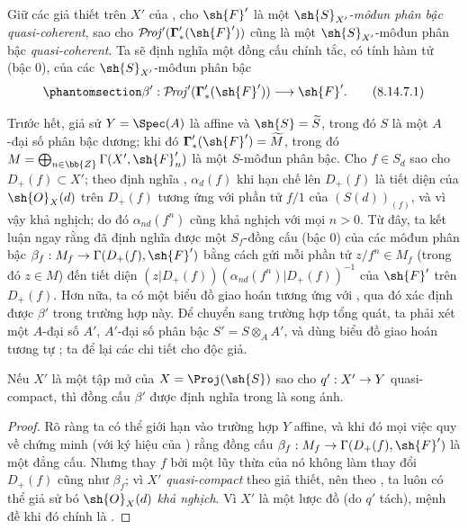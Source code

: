 \documentclass[oneside,10pt]{amsart}
\makeatletter
\newcommand{\ega@arrow}[2]{\mathchoice{#1}{#2}{#2}{#2}}
\renewcommand{\to}{\ega@arrow{\longrightarrow}{\rightarrow}}
\def\shProj{\mathcal{P}\!\mathit{roj}}
\newcommand{\oldpage}[2][]{\marginnote{\normalfont\footnotesize\textbf{#1}~|~#2}\ignorespaces}
\let\EGAOriginalLabel\label
\renewcommand{\label}[1]{\phantomsection\EGAOriginalLabel{#1}}
\makeatother
\begin{document}
\begin{env}[8.14.7]
\label{II.8.14.7}
Giữ các giả thiết trên $X'$ của , cho $\sh{F}'$ là một \emph{$\sh{S}_{X'}$-môđun phân bậc quasi-coherent}, sao cho $\shProj'(\boldsymbol{\Gamma}'_*(\sh{F}'))$ cũng là một $\sh{S}_{X'}$-môđun phân bậc \emph{quasi-coherent}.
\oldpage[II]{200}
Ta sẽ định nghĩa một đồng cấu chính tắc, có tính hàm tử (bậc $0$), của các $\sh{S}_{X'}$-môđun phân bậc
\[
\label{II.8.14.7.1}
    \beta': \shProj'(\boldsymbol{\Gamma}'_*(\sh{F}')) \to \sh{F}'.
\tag{8.14.7.1}
\]

Trước hết, giả sử $Y=\Spec(A)$ là affine và $\sh{S}=\widetilde{S}$, trong đó $S$ là một $A$-đại số phân bậc dương;
khi đó $\boldsymbol{\Gamma}'_*(\sh{F}')=\widetilde{M}$, trong đó $M=\bigoplus_{n\in\bb{Z}}\Gamma(X',\sh{F}'_n)$ là một $S$-môđun phân bậc.
Cho $f\in S_d$ sao cho $D_+(f)\subset X'$;
theo định nghĩa , $\alpha_d(f)$ khi hạn chế lên $D_+(f)$ là tiết diện của $\sh{O}_X(d)$ trên $D_+(f)$ tương ứng với phần tử $f/1$ của $(S(d))_{(f)}$, và vì vậy khả nghịch;
do đó $\alpha_{nd}(f^n)$ cũng khả nghịch với mọi $n>0$.
Từ đây, ta kết luận ngay rằng đã định nghĩa được một $S_f$-đồng cấu (bậc $0$) của các môđun phân bậc $\beta_f:M_f\to\Gamma(D_+(f),\sh{F}')$ bằng cách gửi mỗi phần tử $z/f^n\in M_f$ (trong đó $z\in M$) đến tiết diện $(z|D_+(f))(\alpha_{nd}(f^n)|D_+(f))^{-1}$ của $\sh{F}'$ trên $D_+(f)$.
Hơn nữa, ta có một biểu đồ giao hoán tương ứng với , qua đó xác định được $\beta'$ trong trường hợp này.
Để chuyển sang trường hợp tổng quát, ta phải xét một $A$-đại số $A'$, $A'$-đại số phân bậc $S'=S\otimes_A A'$, và dùng biểu đồ giao hoán tương tự ;
ta để lại các chi tiết cho độc giả.
\end{env}

\begin{proposition}[8.14.8]
\label{II.8.14.8}
Nếu $X'$ là một tập mở của $X=\Proj(\sh{S})$ sao cho $q':X'\to Y$ quasi-compact, thì đồng cấu $\beta'$ được định nghĩa trong  là song ánh.
\end{proposition}

\begin{proof}
Rõ ràng ta có thể giới hạn vào trường hợp $Y$ affine, và khi đó mọi việc quy về chứng minh (với ký hiệu của ) rằng đồng cấu $\beta_f:M_f\to\Gamma(D_+(f),\sh{F}')$ là một đẳng cấu.
Nhưng thay $f$ bởi một lũy thừa của nó không làm thay đổi $D_+(f)$ cũng như $\beta_f$;
vì $X'$ \emph{quasi-compact} theo giả thiết, nên theo , ta luôn có thể giả sử bó $\sh{O}_X(d)$ \emph{khả nghịch}.
Vì $X'$ là một lược đồ (do $q'$ tách), mệnh đề khi đó chính là .
\end{proof}
\end{document}

